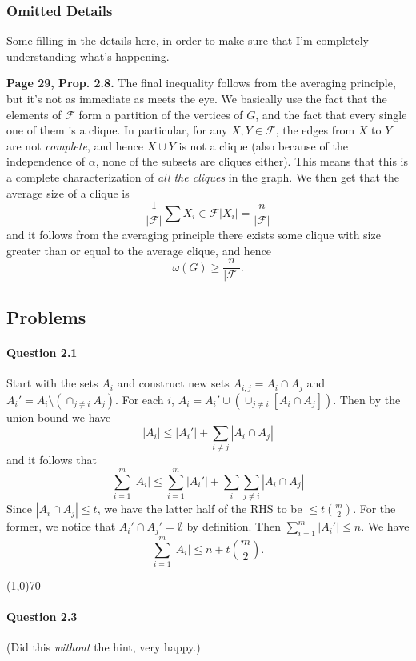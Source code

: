 \subsubsection{Omitted Details}

Some filling-in-the-details here, in order to make sure that I'm completely understanding what's happening.

\textbf{Page 29, Prop. 2.8.} The final inequality follows from the averaging principle, but it's not as immediate as meets the eye. We basically use the fact that the elements of $\mathcal{F}$ form a partition of the vertices of $G$, and the fact that every single one of them is a clique. In particular, for any $X,Y\in\mathcal{F}$, the edges from $X$ to $Y$ are not \textit{complete}, and hence $X\cup Y$ is not a clique (also because of the independence of $\alpha$, none of the subsets are cliques either). This means that this is a complete characterization of \textit{all the cliques} in the graph. We then get that the average size of a clique is
$$\frac{1}{|\mathcal{F}|}\sum{X_i\in\mathcal{F}}|X_i| = \frac{n}{|\mathcal{F}|}$$
and it follows from the averaging principle there exists some clique with size greater than or equal to the average clique, and hence
$$\omega(G)\geq\frac{n}{|\mathcal{F}|}.$$

\subsection{Problems}

\paragraph{Question 2.1} Start with the sets $A_i$ and construct new sets $A_{i,j}=A_i\cap A_j$ and $A_i' = A_i\setminus(\cap_{j\neq i} A_j)$. For each $i$, $A_i = A_i'\cup (\cup_{j\neq i} [A_i\cap A_j])$. Then by the union bound we have
$$|A_i|\leq |A_i'|+\sum_{i\neq j}|A_i\cap A_j|$$
and it follows that 
$$\sum_{i=1}^m |A_i| \leq \sum_{i=1}^m |A_i'| + \sum_{i}\sum_{j\neq i}|A_i\cap A_j|$$
Since $|A_i\cap A_j|\leq t$, we have the latter half of the RHS to be $\leq t\binom{m}{2}$. For the former, we notice that $A_i'\cap A_j'=\emptyset$ by definition. Then $\sum_{i=1}^m |A_i'|\leq n$. We have
$$\sum_{i=1}^m |A_i|\leq n + t\binom{m}{2}.$$

\begin{center}
	\line(1,0){70}
\end{center}

\paragraph{Question 2.3} (Did this \textit{without} the hint, very happy.) 


